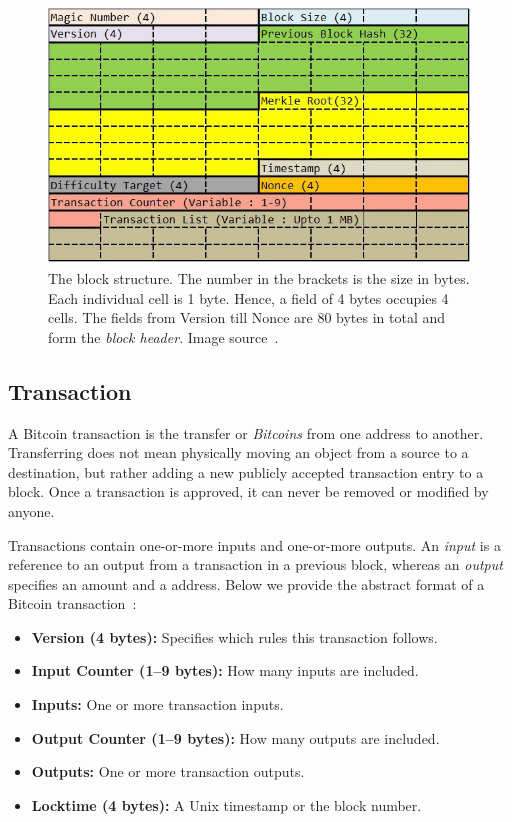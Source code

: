 \begin{figure}[htb]
\includegraphics[width=1\linewidth]{./images/fig1}
\centering
\caption{The block structure. The number in the brackets is the size in bytes. Each individual cell is 1 byte. Hence, a field of 4 bytes occupies 4 cells. The fields from Version till Nonce are 80 bytes in total and form the \textit{block header}. Image source~\cite{medium}.}
\label{fig:fig1}
\end{figure}



\subsection{Transaction}
A Bitcoin transaction is the transfer or \textit{Bitcoins} from one address to another. Transferring does not mean physically moving an object from a source to a destination, but rather adding a new publicly accepted transaction entry to a block. Once a transaction is approved, it can never be removed or modified by anyone.

Transactions contain one-or-more inputs and one-or-more outputs. An \textit{input} is a reference to an output from a transaction in a previous block, whereas an \textit{output} specifies an amount and a address. Below we provide the abstract format of a Bitcoin transaction~\cite{mastering}:

\begin{itemize}
\item \textbf{Version (4 bytes):} Specifies which rules this transaction follows.
\item \textbf{Input Counter (1–9 bytes):} How many inputs are included.
\item \textbf{Inputs:} One or more transaction inputs.
\item \textbf{Output Counter (1–9 bytes):} How many outputs are included.
\item \textbf{Outputs:} One or more transaction outputs.
\item \textbf{Locktime (4 bytes):} A Unix timestamp or the block number.
\end{itemize}



